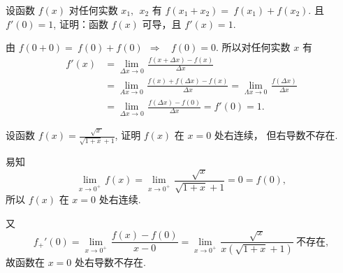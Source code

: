 \begin{problem} 设函数 $f(x)$ 对任何实数 $x_{1},\ \ x_{2}$ 有
$f\left( x_{1} + x_{2} \right) = {\ f}\left( x_{1} \right) + f\left( x_{2} \right)$.
且 $f'\left( 0 \right) = 1$, 证明：函数 $f(x)$ 可导，且
$f'\left( x \right) = 1$.

\begin{solution}
由
$f\left( 0 + 0 \right) = {\ f}\left( 0 \right) + f\left( 0 \right)\ {\ } \Rightarrow \ \ {\ \ f}\left( 0 \right) = 0$.
所以对任何实数 $x$ 有
\begin{equation*}\begin{split}
f'(x) &= \lim_{\Delta x \rightarrow 0}\mspace{2mu}\frac{f(x + \Delta x) - f(x)}{\Delta x} \\
&= \lim_{Ax \rightarrow 0}\mspace{2mu}\frac{f(x) + f(\Delta x) - f(x)}{\Delta x} = \lim_{\Lambda x \rightarrow 0}\mspace{2mu}\frac{f(\Delta x)}{\Delta x} \\
&= \lim_{\Delta x \rightarrow 0}\mspace{2mu}\frac{f(\Delta x) - f(0)}{\Delta x} = f'(0) = 1.
\end{split}
\end{equation*}
\end{solution}

\end{problem}

\begin{problem}
设函数 $\displaystyle f\left( x \right) = \frac{\sqrt{{x\ }}}{\sqrt{1 + x} + 1}$,
证明 $f\left( x \right)$ 在 $x = 0$ 处右连续， 但右导数不存在.

\begin{solution}
	易知
$$ \lim_{x \rightarrow 0^{+}}\mspace{2mu} f(x) = \lim_{x \rightarrow 0^{+}}\mspace{2mu}\frac{\sqrt{x}}{\sqrt{1 + x} + 1} = 0 = f(0),$$
所以 $f\left( x \right)$ 在 $x = 0$ 处右连续.

又
$$f_{+}'(0) = \lim_{x \rightarrow 0^{+}}\mspace{2mu}\frac{f(x) - f(0)}{x - 0} = \lim_{x \rightarrow 0^{+}}\mspace{2mu}\frac{\sqrt{x}}{x(\sqrt{1 + x} + 1)}\ \text{不存在},$$
故函数在 $x = 0$ 处右导数不存在.
\end{solution}

\end{problem}